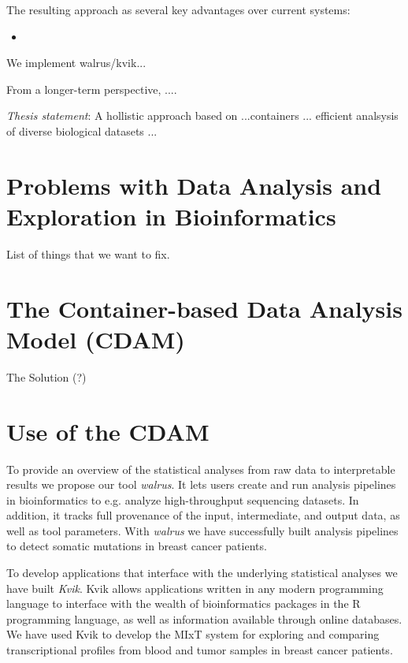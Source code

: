 The resulting approach as several key advantages over current systems: 
\begin{itemize} 
    \item
\end{itemize} 

We implement walrus/kvik... 

From a longer-term perspective, ....

\emph{Thesis statement}:
A hollistic approach based on ...containers ... efficient analsysis of diverse
biological datasets ... 

\section{Problems with Data Analysis and Exploration in Bioinformatics} 
    List of things that we want to fix. 

\section{The Container-based Data Analysis Model (CDAM)} 
    The Solution (?) 

\section{Use of the CDAM} 

To provide an overview of the statistical analyses from raw data to
interpretable results we propose our tool \emph{walrus}. It lets users create
and run analysis pipelines in bioinformatics to e.g. analyze high-throughput
sequencing datasets. In addition, it tracks full provenance of the input,
intermediate, and output data, as well as tool parameters. With \emph{walrus} we
have successfully built analysis pipelines to detect somatic mutations in breast
cancer patients. 

To develop applications that interface with the underlying statistical analyses
we have built \emph{Kvik}. Kvik allows applications written in any modern
programming language to interface with the wealth of bioinformatics packages in
the R programming language, as well as information available through online
databases. We have used Kvik to develop the MIxT system for exploring and
comparing transcriptional profiles from blood and tumor samples in breast cancer
patients. 


